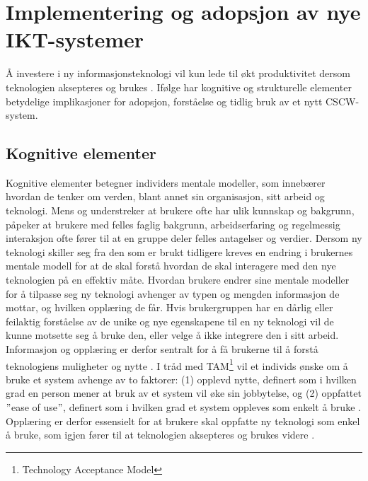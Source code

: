 \section{Implementering og adopsjon av nye IKT-systemer}
\label{sec:implementering}
Å investere i ny informasjonsteknologi vil kun lede til økt produktivitet dersom teknologien aksepteres og brukes \citep{Venkatesh99}. Ifølge \citet{Orlikowski92} har kognitive og strukturelle elementer betydelige implikasjoner for adopsjon, forståelse og tidlig bruk av et nytt CSCW-system. 

\subsection{Kognitive elementer}
\label{sec:kognitive_elementer}
Kognitive elementer betegner individers mentale modeller, som innebærer hvordan de tenker om verden, blant annet sin organisasjon, sitt arbeid og teknologi. Mens \citet{Berg99} og \citet{Ackermann00} understreker at brukere ofte har ulik kunnskap og bakgrunn, påpeker \citet{Orlikowski92} at brukere med felles faglig bakgrunn, arbeidserfaring og regelmessig interaksjon ofte fører til at en gruppe deler felles antagelser og verdier. Dersom ny teknologi skiller seg fra den som er brukt tidligere kreves en endring i brukernes mentale modell for at de skal forstå hvordan de skal interagere med den nye teknologien på en effektiv måte. Hvordan brukere endrer sine mentale modeller for å tilpasse seg ny teknologi avhenger av typen og mengden informasjon de mottar, og hvilken opplæring de får. Hvis brukergruppen har en dårlig eller feilaktig forståelse av de unike og nye egenskapene til en ny teknologi vil de kunne motsette seg å bruke den, eller velge å ikke integrere den i sitt arbeid. Informasjon og opplæring er derfor sentralt for å få brukerne til å forstå teknologiens muligheter og nytte \citep{Orlikowski92}. I tråd med TAM\footnote{Technology Acceptance Model} vil et individs ønske om å bruke et system avhenge av to faktorer: (1) opplevd nytte, definert som i hvilken grad en person mener at bruk av et system vil øke sin jobbytelse, og (2) oppfattet $"$ease of use$"$, definert som i hvilken grad et system oppleves som enkelt å bruke \citep{Venkatesh00}. Opplæring er derfor essensielt for at brukere skal oppfatte ny teknologi som enkel å bruke, som igjen fører til at teknologien aksepteres og brukes videre \citep{Venkatesh99}.

